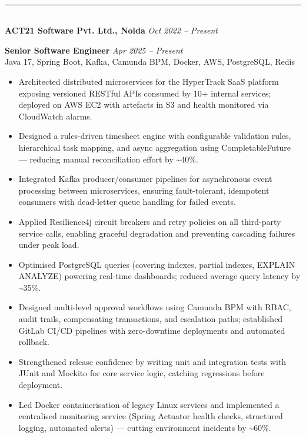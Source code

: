 \documentclass[10pt]{article}
\newcommand{\ressection}[1]{%
  \vspace{5pt}\noindent{\bfseries\color{accent}\MakeUppercase{#1}}\\[1pt]%
  \noindent\textcolor{gray!55}{\rule{\linewidth}{0.7pt}}\\[2pt]%
}
\begin{document}
\ressection{Work Experience}

\textbf{ACT21 Software Pvt. Ltd., Noida} \hfill \textit{Oct 2022 -- Present}

\vspace{2pt}
\textbf{Senior Software Engineer} \hfill \textit{Apr 2025 -- Present}\\
{\color{accent}\footnotesize Java 17, Spring Boot, Kafka, Camunda BPM, Docker, AWS, PostgreSQL, Redis}
\begin{itemize}
\item Architected distributed microservices for the HyperTrack SaaS platform exposing versioned RESTful APIs consumed by 10+ internal services; deployed on AWS EC2 with artefacts in S3 and health monitored via CloudWatch alarms.
\item Designed a rules-driven timesheet engine with configurable validation rules, hierarchical task mapping, and async aggregation using CompletableFuture --- reducing manual reconciliation effort by \textasciitilde40\%.
\item Integrated Kafka producer/consumer pipelines for asynchronous event processing between microservices, ensuring fault-tolerant, idempotent consumers with dead-letter queue handling for failed events.
\item Applied Resilience4j circuit breakers and retry policies on all third-party service calls, enabling graceful degradation and preventing cascading failures under peak load.
\item Optimised PostgreSQL queries (covering indexes, partial indexes, EXPLAIN ANALYZE) powering real-time dashboards; reduced average query latency by \textasciitilde35\%.
\item Designed multi-level approval workflows using Camunda BPM with RBAC, audit trails, compensating transactions, and escalation paths; established GitLab CI/CD pipelines with zero-downtime deployments and automated rollback.
\item Strengthened release confidence by writing unit and integration tests with JUnit and Mockito for core service logic, catching regressions before deployment.
\item Led Docker containerisation of legacy Linux services and implemented a centralised monitoring service (Spring Actuator health checks, structured logging, automated alerts) --- cutting environment incidents by \textasciitilde60\%.
\end{itemize}
\end{document}
